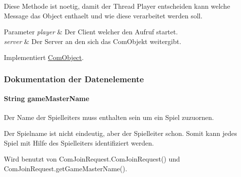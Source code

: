 Diese Methode ist noetig, damit der Thread Player entscheiden kann welche Message das Object enthaelt und wie diese verarbeitet werden soll. 


\begin{DoxyParams}{Parameter}
{\em player} & Der Client welcher den Aufruf startet. \\
\hline
{\em server} & Der Server an den sich das Com\-Objekt weitergibt. \\
\hline
\end{DoxyParams}


Implementiert \hyperlink{a00037_ac67b5ce3ec03d48ef1e6caad6e49c902}{Com\-Object}.



\subsubsection{Dokumentation der Datenelemente}
\hypertarget{a00033_ad3f74f58e5b41a74c02e21e0407280b8}{
\paragraph[{game\-Master\-Name}]{\setlength{\rightskip}{0pt plus 5cm}String game\-Master\-Name\hspace{0.3cm}{\ttfamily [private]}}}\label{a00033_ad3f74f58e5b41a74c02e21e0407280b8}


Der Name der Spielleiters muss enthalten sein um ein Spiel zuzuornen. 

Der Spielname ist nicht eindeutig, aber der Spielleiter schon. Somit kann jedes Spiel mit Hilfe des Spielleiters identifiziert werden. 

Wird benutzt von Com\-Join\-Request.\-Com\-Join\-Request() und Com\-Join\-Request.\-get\-Game\-Master\-Name().

